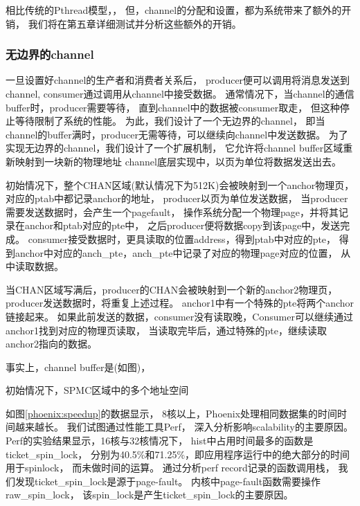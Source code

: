 相比传统的Pthread模型，，
但，channel的分配和设置，都为系统带来了额外的开销，
我们将在第五章详细测试并分析这些额外的开销。


\subsubsection{无边界的channel}
一旦设置好channel的生产者和消费者关系后，
producer便可以调用将消息发送到channel,
consumer通过调用从channel中接受数据。
通常情况下，当channel的通信buffer时，producer需要等待，
直到channel中的数据被consumer取走，
但这种停止等待限制了系统的性能。
为此，我们设计了一个无边界的channel，
即当channel的buffer满时，producer无需等待，可以继续向channel中发送数据。
为了实现无边界的channel，我们设计了一个扩展机制，
它允许将channel buffer区域重新映射到一块新的物理地址
channel底层实现中，以页为单位将数据发送出去。


初始情况下，整个CHAN区域(默认情况下为512K)会被映射到一个anchor物理页，
对应的ptab中都记录anchor的地址，
producer以页为单位发送数据，
当producer需要发送数据时，会产生一个pagefault，
操作系统分配一个物理page，并将其记录在anchor和ptab对应的pte中，
之后producer便将数据copy到该page中，发送完成。
consumer接受数据时，更具读取的位置address，得到ptab中对应的pte，
得到anchor中对应的anch\_pte，anch\_pte中记录了对应的物理page对应的位置，
从中读取数据。

当CHAN区域写满后，producer的CHAN会被映射到一个新的anchor2物理页，
producer发送数据时，将重复上述过程。
anchor1中有一个特殊的pte将两个anchor链接起来。
如果此前发送的数据，consumer没有读取晚，Consumer可以继续通过anchor1找到对应的物理页读取，
当读取完毕后，通过特殊的pte，继续读取anchor2指向的数据。


事实上，channel buffer是(如图)，


初始情况下，SPMC区域中的多个地址空间















如图\ref{phoenix:speedup}的数据显示，
8核以上，Phoenix处理相同数据集的时间时间越来越长。
我们试图通过性能工具Perf\cite{}，
深入分析影响scalability的主要原因。
Perf的实验结果显示，16核与32核情况下，
hist中占用时间最多的函数是ticket\_spin\_lock，
分别为40.5\%和71.25\%，即应用程序运行中的绝大部分的时间用于spinlock，
而未做时间的运算。
通过分析perf record记录的函数调用栈，
我们发现ticket\_spin\_lock是源于page-fault。
内核中page-fault函数需要操作raw\_spin\_lock，
该spin\_lock是产生ticket\_spin\_lock的主要原因。

